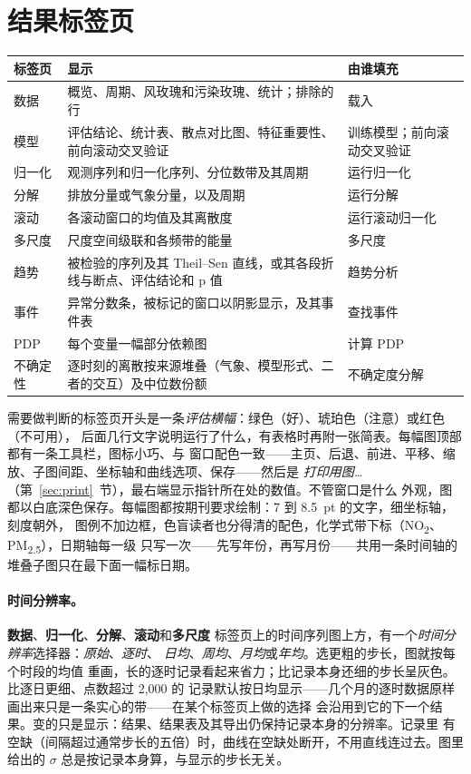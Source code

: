 \documentclass[11pt]{ctexrep}
\newcommand{\tab}[1]{\textbf{#1}}
\newcommand{\NOtwo}{NO\textsubscript{2}}
\newcommand{\PMtwo}{PM\textsubscript{2.5}}
\begin{document}
\section{结果标签页}
\begin{center}\small
\begin{tabular}{@{}lll@{}}
\toprule
标签页 & 显示 & 由谁填充 \\
\midrule
数据     & 概览、周期、风玫瑰和污染玫瑰、统计；排除的行 & 载入 \\
模型     & 评估结论、统计表、散点对比图、特征重要性、前向滚动交叉验证 & 训练模型；前向滚动交叉验证 \\
归一化   & 观测序列和归一化序列、分位数带及其周期 & 运行归一化 \\
分解     & 排放分量或气象分量，以及周期 & 运行分解 \\
滚动     & 各滚动窗口的均值及其离散度 & 运行滚动归一化 \\
多尺度   & 尺度空间级联和各频带的能量 & 多尺度 \\
趋势     & 被检验的序列及其 Theil--Sen 直线，或其各段折线与断点、评估结论和 p 值 & 趋势分析 \\
事件     & 异常分数条，被标记的窗口以阴影显示，及其事件表 & 查找事件 \\
PDP      & 每个变量一幅部分依赖图 & 计算 PDP \\
不确定性 & 逐时刻的离散按来源堆叠（气象、模型形式、二者的交互）及中位数份额 & 不确定度分解 \\
\bottomrule
\end{tabular}
\end{center}
需要做判断的标签页开头是一条\emph{评估横幅}：绿色（好）、琥珀色（注意）或红色（不可用），
后面几行文字说明运行了什么，有表格时再附一张简表。每幅图顶部都有一条工具栏，图标小巧、与
窗口配色一致——主页、后退、前进、平移、缩放、子图间距、坐标轴和曲线选项、保存——然后是
\emph{打印用图…}（第~\ref{sec:print}~节），最右端显示指针所在处的数值。不管窗口是什么
外观，图都以白底深色保存。每幅图都按期刊要求绘制：7 到 8.5~pt 的文字，细坐标轴，刻度朝外，
图例不加边框，色盲读者也分得清的配色，化学式带下标（\NOtwo{}、\PMtwo{}），日期轴每一级
只写一次——先写年份，再写月份——共用一条时间轴的堆叠子图只在最下面一幅标日期。

\paragraph{时间分辨率。}\tab{数据}、\tab{归一化}、\tab{分解}、\tab{滚动}和\tab{多尺度}
标签页上的时间序列图上方，有一个\emph{时间分辨率}选择器：\emph{原始}、\emph{逐时}、
\emph{日均}、\emph{周均}、\emph{月均}或\emph{年均}。选更粗的步长，图就按每个时段的均值
重画，长的逐时记录看起来省力；比记录本身还细的步长呈灰色。比逐日更细、点数超过 2,000 的
记录默认按日均显示——几个月的逐时数据原样画出来只是一条实心的带——在某个标签页上做的选择
会沿用到它的下一个结果。变的只是显示：结果、结果表及其导出仍保持记录本身的分辨率。记录里
有空缺（间隔超过通常步长的五倍）时，曲线在空缺处断开，不用直线连过去。图里给出的 $\sigma$
总是按记录本身算，与显示的步长无关。
\end{document}
